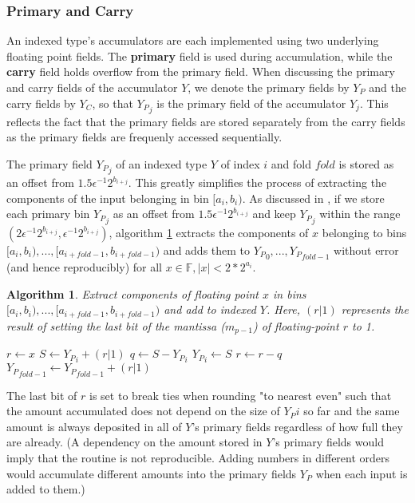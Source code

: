 \documentclass[12pt]{article}
\providecommand{\F}{\ensuremath{\mathbb{F}}}
\theoremstyle{plain}
\newtheorem{alg}{Algorithm}[section]
\begin{document}
    \subsubsection{Primary and Carry}
      An indexed type's accumulators are each implemented using two underlying floating point fields. The \textbf{primary} field is used during accumulation, while the \textbf{carry} field holds overflow from the primary field. When discussing the primary and carry fields of the accumulator $Y$, we denote the primary fields by $Y_P$ and the carry fields by $Y_C$, so that ${Y_P}_j$ is the primary field of the accumulator $Y_j$. This reflects the fact that the primary fields are stored separately from the carry fields as the primary fields are frequenly accessed sequentially.

      The primary field ${Y_P}_j$ of an indexed type $Y$ of index $i$ and fold $fold$ is stored as an offset from $1.5 \epsilon^{-1} 2^{b_{i + j}}$. This greatly simplifies the process of extracting the components of the input belonging in bin $[a_i, b_i)$. As discussed in \cite{repsum}, if we store each primary bin ${Y_P}_j$ as an offset from $1.5 \epsilon^{-1} 2^{b_{i + j}}$ and keep ${Y_P}_j$ within the range $(2 \epsilon^{-1} 2^{b_{i + j}}, \epsilon^{-1} 2^{b_{i + j}})$, algorithm \ref{alg:deposit} extracts the components of $x$ belonging to bins $[a_i, b_i), ..., [a_{i + fold - 1}, b_{i + fold - 1})$ and adds them to ${Y_P}_0, ..., {Y_P}_{fold - 1}$ without error (and hence reproducibly) for all $x \in \F, |x| < 2 * 2^{a_i}$.
      \begin{alg}
        Extract components of floating point $x$ in bins $[a_i, b_i), ..., [a_{i + fold - 1}, b_{i + fold - 1})$ and add to indexed $Y$. Here, $(r | 1)$ represents the result of setting the last bit of the mantissa ($m_{p - 1}$) of floating-point $r$ to 1.
        \begin{algorithmic}
            \State $r \gets x$
              \State $S \gets {Y_P}_i + (r | 1)$
              \State $q \gets S - {Y_P}_i$
              \State ${Y_P}_i \gets S$
              \State $r \gets r - q$
            \EndFor
            \State ${Y_P}_{fold - 1} \gets {Y_P}_{fold - 1} + (r | 1)$
          \EndFunction
        \end{algorithmic}
        \label{alg:deposit}
      \end{alg}
      The last bit of $r$ is set to break ties when rounding "to nearest even" such that the amount accumulated does not depend on the size of ${Y_P}i$ so far and the same amount is always deposited in all of $Y$'s primary fields regardless of how full they are already. (A dependency on the amount stored in $Y$'s primary fields would imply that the routine is not reproducible. Adding numbers in different orders would accumulate different amounts into the primary fields $Y_P$ when each input is added to them.)
\end{document}

